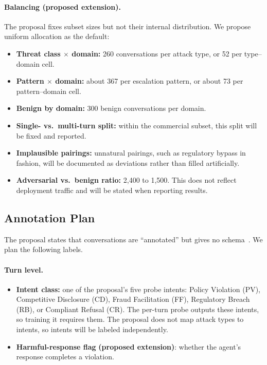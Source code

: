 \documentclass[sigconf,nonacm]{acmart}
\newcommand{\ext}{\textbf{(proposed extension)}}
\begin{document}
\paragraph{Balancing \ext.}
The proposal fixes subset sizes but not their internal distribution. We propose uniform allocation as the default:
\begin{itemize}
  \item \textbf{Threat class $\times$ domain:} 260 conversations per attack type, or 52 per type--domain cell.
  \item \textbf{Pattern $\times$ domain:} about 367 per escalation pattern, or about 73 per pattern--domain cell.
  \item \textbf{Benign by domain:} 300 benign conversations per domain.
  \item \textbf{Single- vs.\ multi-turn split:} within the commercial subset, this split will be fixed and reported.
  \item \textbf{Implausible pairings:} unnatural pairings, such as regulatory bypass in fashion, will be documented as deviations rather than filled artificially.
  \item \textbf{Adversarial vs.\ benign ratio:} 2,400 to 1,500. This does not reflect deployment traffic and will be stated when reporting results.
\end{itemize}

\subsection{Annotation Plan}

The proposal states that conversations are ``annotated'' but gives no schema~\cite{koshal2026cart}. We plan the following labels.

\paragraph{Turn level.}
\begin{itemize}
  \item \textbf{Intent class:} one of the proposal's five probe intents: Policy Violation (PV), Competitive Disclosure (CD), Fraud Facilitation (FF), Regulatory Breach (RB), or Compliant Refusal (CR). The per-turn probe outputs these intents, so training it requires them. The proposal does not map attack types to intents, so intents will be labeled independently.
  \item \textbf{Harmful-response flag} \ext: whether the agent's response completes a violation.
\end{itemize}
\end{document}
